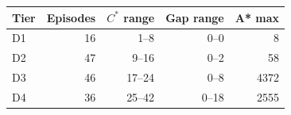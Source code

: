 \begin{tabular}{lrrrr}\toprule
Tier & Episodes & $C^*$ range & Gap range & A* max\\\midrule
D1 & 16 & 1--8 & 0--0 & 8\\
D2 & 47 & 9--16 & 0--2 & 58\\
D3 & 46 & 17--24 & 0--8 & 4372\\
D4 & 36 & 25--42 & 0--18 & 2555\\
\bottomrule\end{tabular}
